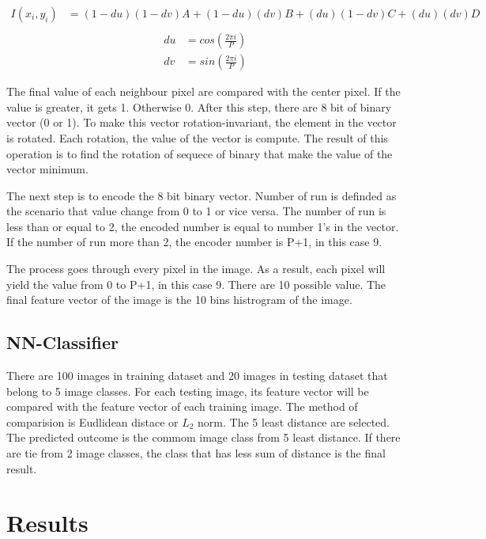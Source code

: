 \documentclass[11pt]{article}
\begin{document}
\begin{align*}
I(x_i, y_i) &= (1-du)(1-dv)A + (1-du)(dv)B + (du)(1-dv)C + (du)(dv)D \\
\end{align*}
\begin{align*}
du &= cos(\frac{2\pi i}{P}) \\
dv &= sin(\frac{2\pi i}{P})
\end{align*}

The final value of each neighbour pixel are compared with the center pixel. If the value is greater, it gets 1. Otherwise 0. After this step, there are 8 bit of binary vector (0 or 1). To make this vector rotation-invariant, the element in the vector is rotated. Each rotation, the value of the vector is compute. The result of this operation is to find the rotation of sequece of binary that make the value of the vector minimum. 

The next step is to encode the 8 bit binary vector. Number of run is definded as the scenario that value change from 0 to 1 or vice versa. The number of run is less than or equal to 2, the encoded number is equal to number 1's in the vector. If the number of run more than 2, the encoder number is P+1, in this case 9.

The process goes through every pixel in the image. As a result, each pixel will yield the value from 0 to P+1, in this case 9. There are 10 possible value. The final feature vector of the image is the 10 bins histrogram of the image.
 

\subsection*{NN-Classifier}

There are 100 images in training dataset and 20 images in testing dataset that belong to 5 image classes. For each testing image, its feature vector will be compared with the feature vector of each training image. The method of comparision is Eudlidean distace or $L_2$ norm. The 5 least distance are selected. The predicted outcome is the commom image class from 5 least distance. If there are tie from 2 image classes, the class that has less sum of distance is the final result.


\section*{Results}
\end{document}
